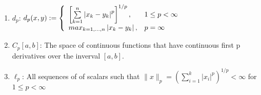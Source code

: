 \documentclass[5pt,letterpaper,reqno]{amsart}
\begin{document}
\begin{enumerate}[1.]
\item $d_p$: $d _ { p } ( x , y ) : = \left\{ \begin{array} { l l } { \left[ \sum\limits_ { k = 1 } ^ { n } \left| x _ { k } - y _ { k } \right| ^ { p } \right] ^ { 1 / p } , } & { 1 \leq p < \infty } \\ { m a x _ { k = 1 , \ldots , n } \left| x _ { k } - y _ { k } \right| , } & { p = \infty } \end{array} \right.$
\item $C_p[a,b]$: The space of continuous functions that have continuous first p derivatives over the inverval $[a,b]$.
\item $\ell_p$: All sequences of of scalars such that $\| x \| _ { p } = \left( \sum\limits _ { i = 1 } ^ { k } \left| x _ { i } \right| ^ { p } \right) ^ { 1 / p } < \infty$ for $1 \leq p < \infty$
\end{enumerate}
\end{document}
